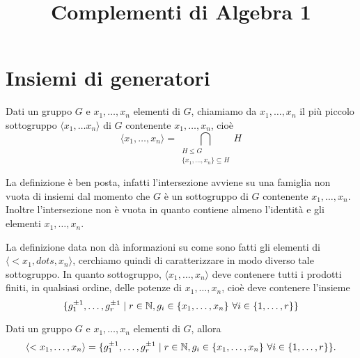 \documentclass[11pt]{scrartcl}
\begin{document}
\title{Complementi di Algebra 1}
\maketitle
\newpage

\tableofcontents
\eject

\newpage

\section{Insiemi di generatori}

\begin{definition}
    Dati un gruppo $G$ e $x_1, \dots, x_n$ elementi di $G$, chiamiamo  da $x_1, \dots, x_n$ il più piccolo sottogruppo $\langle x_1, \dots x_n
    \rangle$ di $G$ contenente $x_1, \dots, x_n$, cioè \[\langle x_1, \dots, x_n\rangle =
    \bigcap_{\substack{H\leq G\\ \{x_1, \dots, x_n\} \subseteq H}} H\] 
\end{definition}

\begin{remark}
    La definizione è ben posta, infatti l'intersezione avviene su una 
    famiglia non vuota di insiemi dal momento che $G$ è un sottogruppo di 
    $G$ contenente $x_1, \dots, x_n$. Inoltre l'intersezione non è vuota in 
    quanto contiene almeno l'identità e gli elementi $x_1, \dots, x_n$.
\end{remark}

La definizione data non dà informazioni su come sono fatti gli elementi di 
$\langle <x_1, dots, x_n\rangle$, cerchiamo quindi di caratterizzare in modo
diverso tale sottogruppo. In quanto sottogruppo, $\langle x_1, \dots, x_n\rangle$
deve contenere tutti i prodotti finiti, in qualsiasi ordine, delle potenze di
$x_1, \dots, x_n$, cioè deve contenere l'insieme 
\[\{g_1^{\pm 1}, \dots, g_r^{\pm 1}\mid r \in \mathbb N, g_i \in \{x_1, \dots, x_n\}
~\forall i \in \{1, \dots, r\}\}\]

\begin{proposition}
\label{prop1.0}
Dati un gruppo $G$ e $x_1, \dots, x_n$ elementi di $G$, allora \[
    \langle <x_1, \dots, x_n\rangle = \{g_1^{\pm 1}, \dots, g_r^{\pm 1}\mid r 
    \in \mathbb N, g_i \in \{x_1, \dots, x_n\}~\forall i \in \{1, \dots, r\}\}.
    \]
\end{proposition}
\end{document}
